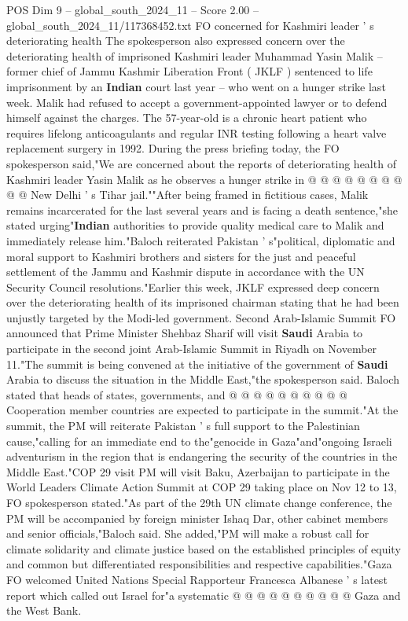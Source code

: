 \begin{textsample}{POS Dim 9 – global\_south\_2024\_11 – Score 2.00 – global\_south\_2024\_11/117368452.txt}
FO concerned for Kashmiri leader ' s deteriorating health The spokesperson also expressed concern over the deteriorating health of imprisoned Kashmiri leader Muhammad Yasin Malik -- former chief of Jammu Kashmir Liberation Front ( JKLF ) sentenced to life imprisonment by an \textbf{Indian} court last year -- who went on a hunger strike last week.
Malik had refused to accept a government-appointed lawyer or to defend himself against the charges.
The 57-year-old is a chronic heart patient who requires lifelong anticoagulants and regular INR testing following a heart valve replacement surgery in 1992.
During the press briefing today, the FO spokesperson said,"We are concerned about the reports of deteriorating health of Kashmiri leader Yasin Malik as he observes a hunger strike in @ @ @ @ @ @ @ @ @ @ New Delhi ' s Tihar jail.""After being framed in fictitious cases, Malik remains incarcerated for the last several years and is facing a death sentence,"she stated urging"\textbf{Indian} authorities to provide quality medical care to Malik and immediately release him."Baloch reiterated Pakistan ' s"political, diplomatic and moral support to Kashmiri brothers and sisters for the just and peaceful settlement of the Jammu and Kashmir dispute in accordance with the UN Security Council resolutions."Earlier this week, JKLF expressed deep concern over the deteriorating health of its imprisoned chairman stating that he had been unjustly targeted by the Modi-led government.
Second Arab-Islamic Summit FO announced that Prime Minister Shehbaz Sharif will visit \textbf{Saudi} Arabia to participate in the second joint Arab-Islamic Summit in Riyadh on November 11."The summit is being convened at the initiative of the government of \textbf{Saudi} Arabia to discuss the situation in the Middle East,"the spokesperson said.
Baloch stated that heads of states, governments, and @ @ @ @ @ @ @ @ @ @ Cooperation member countries are expected to participate in the summit."At the summit, the PM will reiterate Pakistan ' s full support to the Palestinian cause,"calling for an immediate end to the"genocide in Gaza"and"ongoing Israeli adventurism in the region that is endangering the security of the countries in the Middle East."COP 29 visit PM will visit Baku, Azerbaijan to participate in the World Leaders Climate Action Summit at COP 29 taking place on Nov 12 to 13, FO spokesperson stated."As part of the 29th UN climate change conference, the PM will be accompanied by foreign minister Ishaq Dar, other cabinet members and senior officials,"Baloch said.
She added,"PM will make a robust call for climate solidarity and climate justice based on the established principles of equity and common but differentiated responsibilities and respective capabilities."Gaza FO welcomed United Nations Special Rapporteur Francesca Albanese ' s latest report which called out Israel for"a systematic @ @ @ @ @ @ @ @ @ @ Gaza and the West Bank.

\end{textsample}
